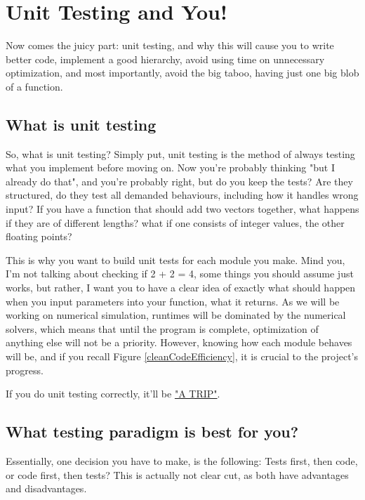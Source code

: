 \documentclass[10pt,a4paper]{article}
\begin{document}
\newpage
\section{Unit Testing and You!}

Now comes the juicy part: unit testing, and why this will cause you to write better code, implement a good hierarchy, avoid using time on unnecessary optimization, and most importantly, avoid the big taboo, having just one big blob of a function.

\subsection{What is unit testing}
So, what is unit testing? Simply put, unit testing is the method of always testing what you implement before moving on. Now you're probably thinking "but I already do that", and you're probably right, but do you keep the tests? Are they structured, do they test all demanded behaviours, including how it handles wrong input? If you have a function that should add two vectors together, what happens if they are of different lengths? what if one consists of integer values, the other floating points? 

This is why you want to build unit tests for each module you make. Mind you, I'm not talking about checking if 2 + 2 = 4, some things you should assume just works, but rather, I want you to have a clear idea of exactly what should happen when you input parameters into your function, what it returns. As we will be working on numerical simulation, runtimes will be dominated by the numerical solvers, which means that until the program is complete, optimization of anything else will not be a priority. However, knowing how each module behaves will be, and if you recall Figure \ref{cleanCodeEfficiency}, it is crucial to the project's progress. 

If you do unit testing correctly, it'll be \href{http://stackoverflow.com/questions/61400/what-makes-a-good-unit-test}{"A TRIP"}.

\subsection{What testing paradigm is best for you?}

Essentially, one decision you have to make, is the following: Tests first, then code, or code first, then tests? This is actually not clear cut, as both have advantages and disadvantages. 
\end{document}

